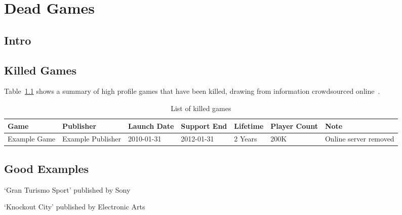 \chapter{Dead Games}

\section{Intro}


\section{Killed Games}


Table~\ref{tab:killedgames} shows a summary of high profile games that have been killed, drawing from information crowdsourced online~\cite{dead-games-list-2016}.

\begin{landscape}
\begin{table}[htbp]
    \centering
    \caption{List of killed games}%
    \label{tab:killedgames}
    \begin{tabular*}{1\textwidth}{lllllll}
        Game & Publisher & Launch Date & Support End & Lifetime & Player Count & Note \\ \toprule
        Example Game & Example Publisher & 2010-01-31 & 2012-01-31 & 2 Years & 200K & Online server removed \\
    \end{tabular*}
\end{table}
\end{landscape}

\section{Good Examples}

`Gran Turismo Sport' published by Sony

`Knockout City' published by Electronic Arts

